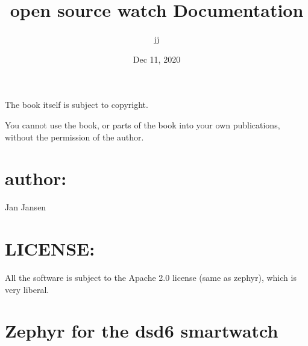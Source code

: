 \documentclass[letterpaper,10pt,english]{sphinxmanual}
\title{open source watch Documentation}
\date{Dec 11, 2020}
\author{jj}
\begin{document}
\pagestyle{empty}
\sphinxmaketitle
\pagestyle{plain}
\sphinxtableofcontents
\pagestyle{normal}
\label{\detokenize{index::doc}}
\noindent{}




The book itself is subject to copyright.

You cannot use the book, or parts of the book into your own publications, without the permission of the author.


\chapter{author:}
\label{\detokenize{copyright:author}}
Jan Jansen


\chapter{LICENSE:}
\label{\detokenize{copyright:license}}
All the software is subject to the Apache 2.0 license (same as zephyr), which is very liberal.


\chapter{Zephyr for the ds\sphinxhyphen{}d6    smartwatch}
\label{\detokenize{content:zephyr-for-the-ds-d6-smartwatch}}\label{\detokenize{content::doc}}
\begin{sphinxVerbatim}[commandchars=\\\{\}]
           


            
\end{sphinxVerbatim}
\end{document}
